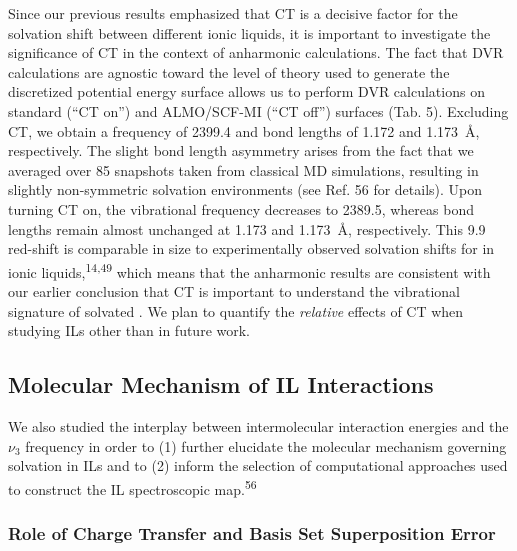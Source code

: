 Since our previous results emphasized that CT is a decisive factor for the  solvation shift between different ionic liquids, it is important to investigate the significance of CT in the context of anharmonic calculations. The fact that DVR calculations are agnostic toward the level of theory used to generate the discretized potential energy surface allows us to perform DVR calculations on standard (``CT on'') and ALMO/SCF-MI (``CT off'') surfaces (Tab. 5). Excluding CT, we obtain a frequency of \SI{2399.4}{\wavenumber} and bond lengths of \num{1.172} and \SI{1.173}{\angstrom}, respectively. The slight bond length asymmetry arises from the fact that we averaged over \num{85} snapshots taken from classical MD simulations, resulting in slightly non-symmetric solvation environments (see Ref. 56 for details). Upon turning CT on, the vibrational frequency decreases to \SI{2389.5}{\wavenumber}, whereas bond lengths remain almost unchanged at \num{1.173} and \SI{1.173}{\angstrom}, respectively. This \SI{9.9}{\wavenumber} red-shift is comparable in size to experimentally observed solvation shifts for  in ionic liquids,\textsuperscript{14,49} which means that the anharmonic results are consistent with our earlier conclusion that CT is important to understand the vibrational signature of solvated .  We plan to quantify the \emph{relative} effects of CT when studying ILs other than \ce{[C4C1im][PF6]} in future work.

\subsection{Molecular Mechanism of \textendash{}IL Interactions}
\label{paper_02:ssec:IIIC}

We also studied the interplay between intermolecular interaction energies and the  \(\nu_{3}\) frequency in order to (1) further elucidate the molecular mechanism governing  solvation in ILs and to (2) inform the selection of computational approaches used to construct the \textendash{}IL spectroscopic map.\textsuperscript{56}

\subsubsection{Role of Charge Transfer and Basis Set Superposition Error}
\label{paper_02:sssec:IIIC1}

